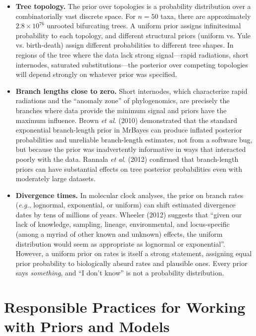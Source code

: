 \begin{itemize}
    \item \textbf{Tree topology.} The prior over topologies is a probability distribution over a combinatorially vast discrete space. For $n = 50$ taxa, there are approximately $2.8 \times 10^{76}$ unrooted bifurcating trees. A uniform prior assigns infinitesimal probability to each topology, and different structural priors (uniform vs. Yule vs. birth-death) assign different probabilities to different tree shapes. In regions of the tree where the data lack strong signal---rapid radiations, short internodes, saturated substitutions---the posterior over competing topologies will depend strongly on whatever prior was specified.

    \item \textbf{Branch lengths close to zero.} Short internodes, which characterize rapid radiations and the ``anomaly zone'' of phylogenomics, are precisely the branches where data provide the minimum signal and priors have the maximum influence. Brown \textit{et al}. (2010) demonstrated that the standard exponential branch-length prior in MrBayes can produce inflated posterior probabilities and unreliable branch-length estimates, not from a software bug, but because the prior was inadvertently informative in ways that interacted poorly with the data. Rannala \textit{et al}. (2012) confirmed that branch-length priors can have substantial effects on tree posterior probabilities even with moderately large datasets.

    \item \textbf{Divergence times.} In molecular clock analyses, the prior on branch rates (\textit{e.g.}, lognormal, exponential, or uniform) can shift estimated divergence dates by tens of millions of years. Wheeler (2012) suggests that ``given our lack of knowledge, sampling, lineage, environmental, and locus-specific (among a myriad of other known and unknown) effects, the uniform distribution would seem as appropriate as lognormal or exponential''. However, a uniform prior on rates is itself a strong statement, assigning equal prior probability to biologically absurd rates and plausible ones. Every prior says \textit{something}, and ``I don't know'' is not a probability distribution.
\end{itemize}

\section{Responsible Practices for Working with Priors and Models}

